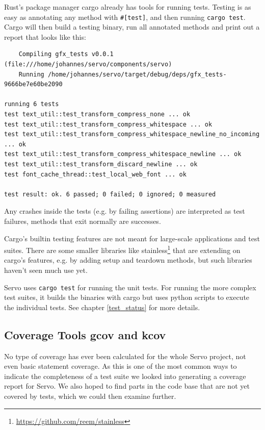 \documentclass{scrartcl}
\begin{document}
Rust's package manager cargo already has tools for running tests. Testing is as easy as annotating any method with \texttt{\#[test]}, and then running \texttt{cargo test}. Cargo will then build a testing binary, run all annotated methods and print out a report that looks like this:


\small {

\begin{verbatim}
    Compiling gfx_tests v0.0.1 (file:///home/johannes/servo/components/servo)
    Running /home/johannes/servo/target/debug/deps/gfx_tests-9666be7e60be2090

running 6 tests
test text_util::test_transform_compress_none ... ok
test text_util::test_transform_compress_whitespace ... ok
test text_util::test_transform_compress_whitespace_newline_no_incoming ... ok
test text_util::test_transform_compress_whitespace_newline ... ok
test text_util::test_transform_discard_newline ... ok
test font_cache_thread::test_local_web_font ... ok

test result: ok. 6 passed; 0 failed; 0 ignored; 0 measured

\end{verbatim}
}

Any crashes inside the tests (e.g. by failing assertions) are interpreted as test failures, methods that exit normally are successes.

Cargo's builtin testing features are not meant for large-scale applications and test suites. There are some smaller libraries like stainless\footnote{\url{https://github.com/reem/stainless}} that are extending on cargo's features, e.g. by adding setup and teardown methods, but such libraries haven't seen much use yet. 

Servo uses \texttt{cargo test} for running the unit tests. For running the more complex test suites, it builds the binaries with cargo but uses python scripts to execute the individual tests. See chapter \ref{test_status} for more details.


\subsection{Coverage Tools gcov and kcov}

No type of coverage has ever been calculated for the whole Servo project, not even basic statement coverage. As this is one of the most common ways to indicate the completeness of a test suite we looked into generating a coverage report for Servo. We also hoped to find parts in the code base that are not yet covered by tests, which we could then examine further. 
\end{document}
